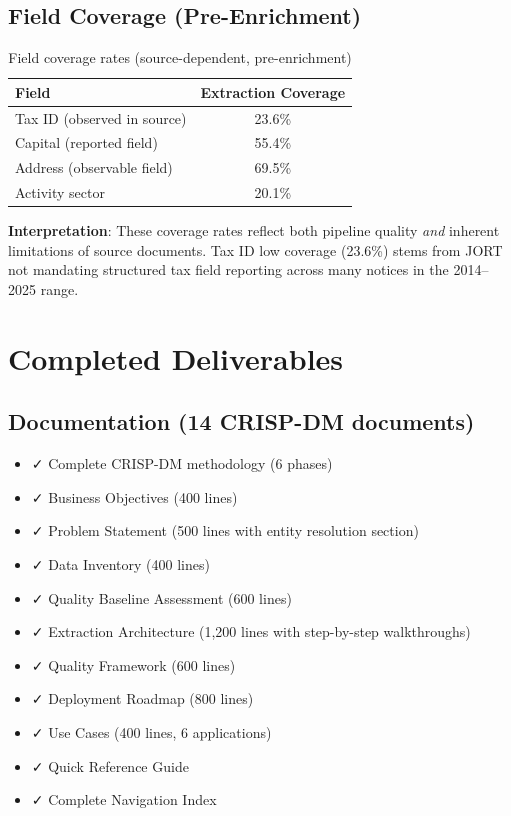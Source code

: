 \documentclass[12pt,a4paper]{report}
\begin{document}
\subsection{Field Coverage (Pre-Enrichment)}

\begin{table}[H]
\centering
\begin{tabular}{|l|c|}
\hline
\textbf{Field} & \textbf{Extraction Coverage} \\
\hline
Tax ID (observed in source) & 23.6\% \\
Capital (reported field) & 55.4\% \\
Address (observable field) & 69.5\% \\
Activity sector & 20.1\% \\
\hline
\end{tabular}
\caption{Field coverage rates (source-dependent, pre-enrichment)}
\end{table}

\textbf{Interpretation}: These coverage rates reflect both pipeline quality \textit{and} inherent limitations of source documents. Tax ID low coverage (23.6\%) stems from JORT not mandating structured tax field reporting across many notices in the 2014--2025 range.

\section{Completed Deliverables}

\subsection{Documentation (14 CRISP-DM documents)}

\begin{itemize}
    \item ✓ Complete CRISP-DM methodology (6 phases)
    \item ✓ Business Objectives (400 lines)
    \item ✓ Problem Statement (500 lines with entity resolution section)
    \item ✓ Data Inventory (400 lines)
    \item ✓ Quality Baseline Assessment (600 lines)
    \item ✓ Extraction Architecture (1,200 lines with step-by-step walkthroughs)
    \item ✓ Quality Framework (600 lines)
    \item ✓ Deployment Roadmap (800 lines)
    \item ✓ Use Cases (400 lines, 6 applications)
    \item ✓ Quick Reference Guide
    \item ✓ Complete Navigation Index
\end{itemize}
\end{document}
